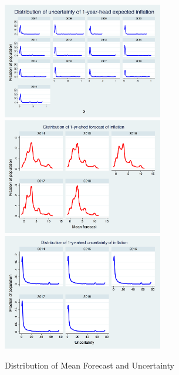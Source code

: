\documentclass[]{article}
\begin{document}
\begin{figure}[ht]
	\includegraphics[width=7cm]{figures/PRCPCEVar1_hist.png}  \\
	\smallskip
		\includegraphics[width=7cm]{figures/SCEmean_hist.png} 
	\includegraphics[width=7cm]{figures/SCEvar_hist.png}  \\
	\caption{Distribution of Mean Forecast and Uncertainty }
	\label{Unceratitny_Histogram}
\end{figure}
\end{document}
